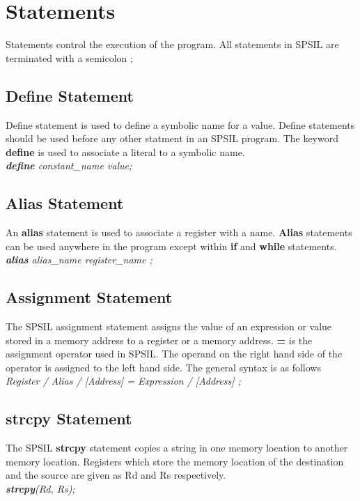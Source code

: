 \section{Statements}

Statements control the execution of the program. All statements in SPSIL are terminated with a semicolon ;



\subsection{Define Statement}
Define statement is used to define a symbolic name for a value. Define statements should be  used before any other statment in an SPSIL program. The keyword \textbf{define} is used to associate a literal to a symbolic name. \\

\textit{ \textbf{define} constant\_name value; }


\subsection{Alias Statement}
An \textbf{alias} statement is used to  associate a register with a name. \textbf{Alias} statements can be used anywhere in the program except within \textbf{if} and \textbf{while} statements.\\

\indent \textit{ \textbf{alias}  alias\_name register\_name ;} \\


\subsection{Assignment Statement}
The SPSIL assignment statement assigns the value of an  expression or value stored in a memory address to a register or a memory address. \textbf{=} is the assignment operator used in SPSIL. The operand on the right hand side of the operator is assigned to the left hand side. The general syntax is as follows \\

\indent \textit{ Register / Alias / [Address] = Expression / [Address] ;}

\subsection{strcpy Statement}
The SPSIL \textbf{strcpy} statement copies a string in one memory location to another memory location. Registers which store the  memory location of the destination and the source are given as R{\tiny d} and R{\tiny s} respectively.\\
\indent \textit{ \textbf{strcpy}(R{\tiny d}, R{\tiny s});}


